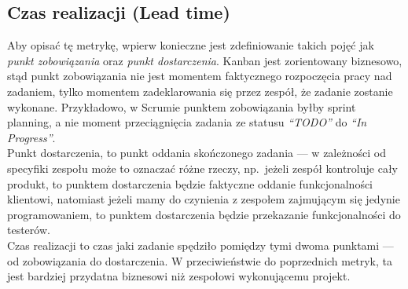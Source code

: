 \subsection{Czas realizacji (Lead time)}
Aby opisać tę metrykę, wpierw konieczne jest zdefiniowanie takich pojęć jak \textit{punkt zobowiązania} oraz \textit{punkt dostarczenia}.
Kanban jest zorientowany biznesowo, stąd punkt zobowiązania nie jest momentem faktycznego rozpoczęcia pracy nad zadaniem, tylko momentem zadeklarowania się przez zespół, że zadanie zostanie wykonane.
Przykładowo, w Scrumie punktem zobowiązania byłby sprint planning, a nie moment przeciągnięcia zadania ze statusu \textit{``TODO''} do \textit{``In Progress''}.\\
Punkt dostarczenia, to punkt oddania skończonego zadania --- w zależności od specyfiki zespołu może to oznaczać różne rzeczy, np.\ jeżeli zespół kontroluje cały produkt, to punktem dostarczenia
będzie faktyczne oddanie funkcjonalności klientowi, natomiast jeżeli mamy do czynienia z zespołem zajmującym się jedynie programowaniem, to punktem dostarczenia będzie przekazanie funkcjonalności do testerów.\\
Czas realizacji to czas jaki zadanie spędziło pomiędzy tymi dwoma punktami --- od zobowiązania do dostarczenia.
W przeciwieństwie do poprzednich metryk, ta jest bardziej przydatna biznesowi niż zespołowi wykonującemu projekt.
